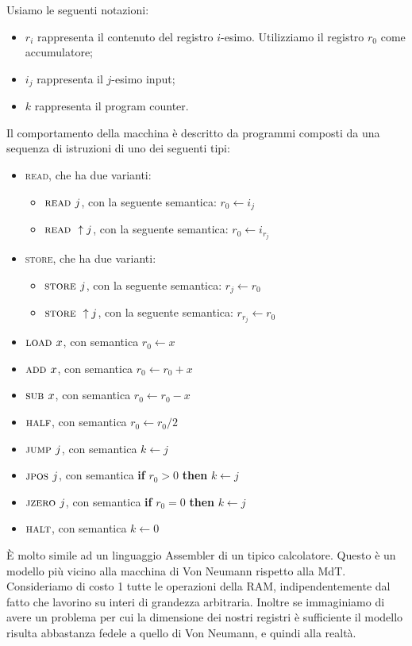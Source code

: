 Usiamo le seguenti notazioni:
\begin{itemize}
    \item $r_{i}$ rappresenta il contenuto del registro $i$-esimo. Utilizziamo il registro $r_{0}$
    come accumulatore;
    \item $i_{j}$ rappresenta il $j$-esimo input;
    \item $k$ rappresenta il program counter.
\end{itemize}
Il comportamento della macchina è descritto da programmi composti da una sequenza di istruzioni di
uno dei seguenti tipi:
\begin{itemize}
    \item \textsc{read}, che ha due varianti:
    \begin{itemize}
        \item $\textsc{read }j$, con la seguente semantica: $r_{0} \gets i_{j}$ 
        \item $\textsc{read }\uparrow j$, con la seguente semantica: $r_{0} \gets i_{r_{j}}$ 
    \end{itemize}
    \item \textsc{store}, che ha due varianti:
    \begin{itemize}
        \item $\textsc{store }j$, con la seguente semantica: $r_{j} \gets r_{0}$ 
        \item $\textsc{store }\uparrow j$, con la seguente semantica: $r_{r_{j}} \gets r_{0}$ 
    \end{itemize}
    \item $\textsc{load }x$, con semantica $r_{0} \gets x$
    \item $\textsc{add }x$, con semantica $r_{0} \gets r_{0} + x$
    \item $\textsc{sub }x$, con semantica $r_{0} \gets r_{0} - x$
    \item $\textsc{half}$, con semantica $r_{0} \gets r_{0} / 2$
    \item $\textsc{jump }j$, con semantica $k \gets j$
    \item $\textsc{jpos }j$, con semantica \textbf{if} $r_{0} > 0$ \textbf{then} $k \gets j$
    \item $\textsc{jzero }j$, con semantica \textbf{if} $r_{0} = 0$ \textbf{then} $k \gets j$
    \item $\textsc{halt}$, con semantica $k \gets 0$
\end{itemize}

È molto simile ad un linguaggio Assembler di un tipico calcolatore. Questo è un modello più
vicino alla macchina di Von Neumann rispetto alla MdT. Consideriamo di costo 1 tutte le operazioni
della RAM, indipendentemente dal fatto che lavorino su interi di grandezza arbitraria. Inoltre se
immaginiamo di avere un problema per cui la dimensione dei nostri registri è sufficiente il modello
risulta abbastanza fedele a quello di Von Neumann, e quindi alla realtà.

